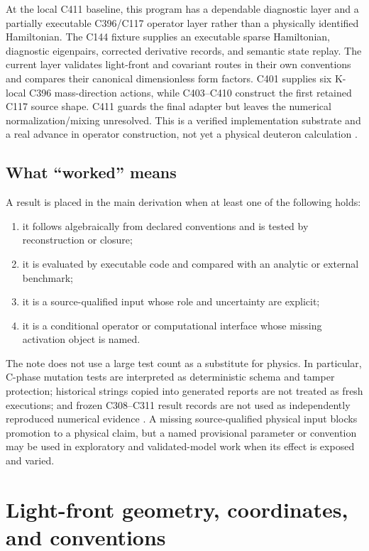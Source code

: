 \documentclass[11pt,oneside]{book}
\begin{document}
At the local C411 baseline, this program has a dependable diagnostic layer and a partially executable C396/C117 operator layer rather than a physically identified Hamiltonian.  The C144 fixture supplies an executable sparse Hamiltonian, diagnostic eigenpairs, corrected derivative records, and semantic state replay.  The current layer validates light-front and covariant routes in their own conventions and compares their canonical dimensionless form factors.  C401 supplies six K-local C396 mass-direction actions, while C403--C410 construct the first retained C117 source shape.  C411 guards the final adapter but leaves the numerical normalization/mixing unresolved.  This is a verified implementation substrate and a real advance in operator construction, not yet a physical deuteron calculation \cite{DWC400S2Record2026,DWC401C410Record2026,DWC411Record2026}.

\section{What ``worked'' means}

A result is placed in the main derivation when at least one of the following holds:
\begin{enumerate}
\item it follows algebraically from declared conventions and is tested by reconstruction or closure;
\item it is evaluated by executable code and compared with an analytic or external benchmark;
\item it is a source-qualified input whose role and uncertainty are explicit;
\item it is a conditional operator or computational interface whose missing activation object is named.
\end{enumerate}
The note does not use a large test count as a substitute for physics.  In particular, C-phase mutation tests are interpreted as deterministic schema and tamper protection; historical strings copied into generated reports are not treated as fresh executions; and frozen C308--C311 result records are not used as independently reproduced numerical evidence \cite{DWSourceAudit2026}.  A missing source-qualified physical input blocks promotion to a physical claim, but a named provisional parameter or convention may be used in exploratory and validated-model work when its effect is exposed and varied.

\chapter{Light-front geometry, coordinates, and conventions}
\label{chap:kinematics}
\end{document}
